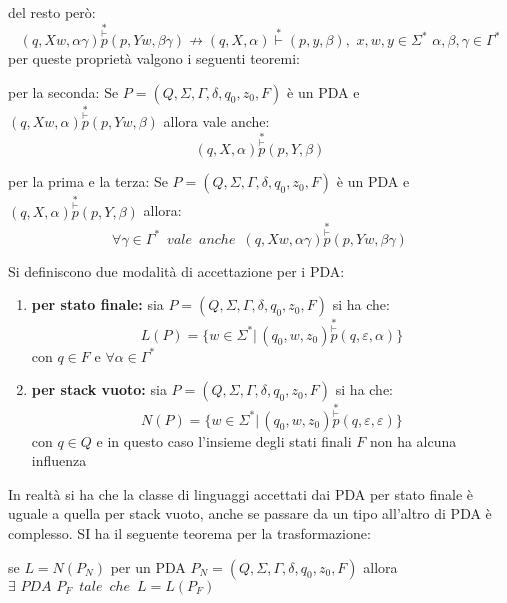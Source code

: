 \documentclass[a4paper,12pt, oneside]{book}
\begin{document}
del resto però:
$$(q,Xw,\alpha\gamma) \stackrel{*}{\stackrel{\vdash}{p}} (p,Yw,\beta\gamma)\not\to (q,X,\alpha) \stackrel{*}{\vdash}(p,y,\beta),\,\,x,w,y\in\Sigma^*\,\,\alpha,\beta,\gamma\in\Gamma^*$$
per queste proprietà valgono i seguenti teoremi:
\begin{teorema}
per la seconda:
Se $P=(Q,\Sigma,\Gamma,\delta,q_0,z_0,F)$ è un PDA e $(q,Xw,\alpha) \stackrel{*}{\stackrel{\vdash}{p}} (p,Yw,\beta)$ allora vale anche:
$$(q,X,\alpha) \stackrel{*}{\stackrel{\vdash}{p}} (p,Y,\beta)$$
\end{teorema}
\begin{teorema}
per la prima e la terza:
Se $P=(Q,\Sigma,\Gamma,\delta,q_0,z_0,F)$ è un PDA e $(q,X,\alpha) \stackrel{*}{\stackrel{\vdash}{p}} (p,Y,\beta)$ allora:
$$\forall\gamma\in\Gamma^*\,\,\,vale\,\,\,anche\,\,\,(q,Xw,\alpha\gamma) \stackrel{*}{\stackrel{\vdash}{p}} (p,Yw,\beta\gamma)$$
\end{teorema}
Si definiscono due modalità di accettazione per i PDA:
\begin{enumerate}
\item \textbf{per stato finale:} sia $P=(Q,\Sigma,\Gamma,\delta,q_0,z_0,F)$ si ha che:
$$L(P)=\{w\in\Sigma^*|\,(q_0,w,z_0) \stackrel{*}{\stackrel{\vdash}{p}} (q,\varepsilon,\alpha)\}$$
con $q\in F$ e $\forall \alpha\in \Gamma^*$
\item \textbf{per stack vuoto:} sia $P=(Q,\Sigma,\Gamma,\delta,q_0,z_0,F)$ si ha che:
$$N(P)=\{w\in\Sigma^*|\,(q_0,w,z_0) \stackrel{*}{\stackrel{\vdash}{p}} (q,\varepsilon,\varepsilon)\}$$
con $q\in Q$ e in questo caso l'insieme degli stati finali $F$ non ha alcuna influenza
\end{enumerate}
In realtà si ha che la classe di linguaggi accettati dai PDA per stato finale è uguale a quella per stack vuoto, anche se passare da un tipo all'altro di PDA è complesso. SI ha il seguente teorema per la trasformazione:
\begin{teorema}
se $L=N(P_N)$ per un PDA  $P_N=(Q,\Sigma,\Gamma,\delta,q_0,z_0,F)$ allora $\exists \,\,PDA\,\,P_F\,\,\,tale\,\,\,che\,\,\,L=L(P_F)$
\end{teorema}
\end{document}
